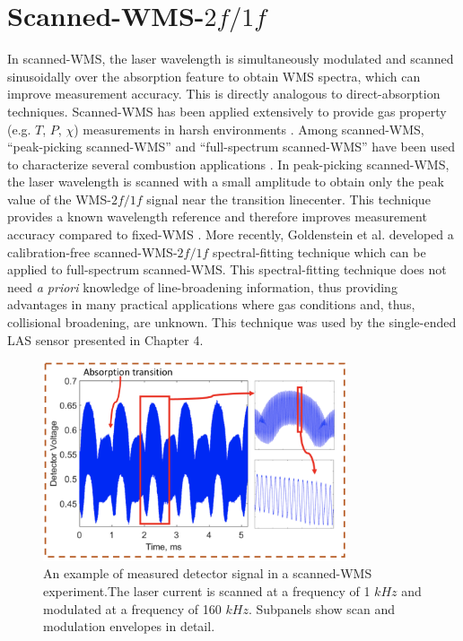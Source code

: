 \section{Scanned-WMS-$2f/1f$}
In scanned-WMS, the laser wavelength is simultaneously modulated and scanned sinusoidally over the absorption feature to obtain WMS spectra, which can improve measurement accuracy. This is directly analogous to direct-absorption techniques. Scanned-WMS has been applied extensively to provide gas property (e.g. $T$, $P$, $\chi$) measurements in harsh environments \cite{Goldenstein2017,Ma2013,Caswell2013,Stritzke2015,Witzel2013,Whitney2011,Makowiecki2017,Rieker2009b,Li2011}. Among scanned-WMS, ``peak-picking scanned-WMS'' and ``full-spectrum scanned-WMS'' have been used to characterize several combustion applications \cite{WOLFRUM19981,HANSON20111,Goldenstein2017,hanson2016spectroscopy,Schulz2007}. In peak-picking scanned-WMS, the laser wavelength is scanned with a small amplitude to obtain only the peak value of the WMS-$2f/1f$ signal near the transition linecenter. This technique provides a known wavelength reference and therefore improves measurement accuracy compared to fixed-WMS \cite{goldenstein20151}. More recently, Goldenstein et al. \cite{Goldenstein2014} developed a calibration-free scanned-WMS-$2f/1f$ spectral-fitting technique which can be applied to full-spectrum scanned-WMS. This spectral-fitting technique does not need \textit{a priori} knowledge of line-broadening information, thus providing advantages in many practical applications where gas conditions and, thus, collisional broadening, are unknown. This technique was used by the single-ended LAS sensor presented in Chapter 4. 

 \begin{figure}[h]
    \centering
        \includegraphics[trim = 0mm 0mm 0mm 0mm, clip=true, width=0.8\textwidth]{fig/ch3_fig3_v2.png}
        \caption{An example of measured detector signal in a scanned-WMS experiment.The laser current is scanned at a frequency of 1 $kHz$ and modulated at a frequency of 160 $kHz$. Subpanels show scan and modulation envelopes in detail.}
    \label{fig:ch4_1}
\end{figure}

